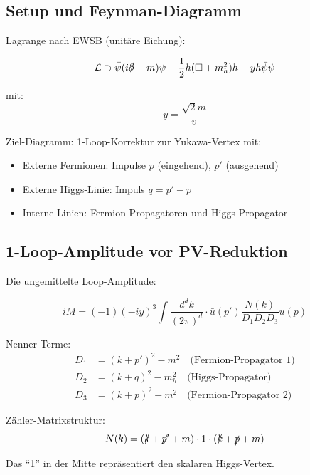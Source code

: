 	\subsection{Setup und Feynman-Diagramm}
	
	Lagrange nach EWSB (unitäre Eichung):
	
	\begin{equation}
		\mathcal{L} \supset \bar{\psi}(i\slashed{\partial} - m)\psi - \frac{1}{2}h(\Box + m_h^2)h - y h \bar{\psi}\psi
	\end{equation}
	
	mit:
	\begin{equation}
		y = \frac{\sqrt{2} m}{v}
	\end{equation}
	
	Ziel-Diagramm: 1-Loop-Korrektur zur Yukawa-Vertex mit:
	\begin{itemize}
		\item Externe Fermionen: Impulse $p$ (eingehend), $p'$ (ausgehend)
		\item Externe Higgs-Linie: Impuls $q = p' - p$
		\item Interne Linien: Fermion-Propagatoren und Higgs-Propagator
	\end{itemize}
	
	\subsection{1-Loop-Amplitude vor PV-Reduktion}
	
	Die ungemittelte Loop-Amplitude:
	
	\begin{equation}
		iM = (-1)(-iy)^3 \int \frac{d^d k}{(2\pi)^d} \cdot \bar{u}(p') \frac{N(k)}{D_1 D_2 D_3} u(p)
	\end{equation}
	
	Nenner-Terme:
	\begin{align}
		D_1 &= (k + p')^2 - m^2 \quad \text{(Fermion-Propagator 1)}\\
		D_2 &= (k + q)^2 - m_h^2 \quad \text{(Higgs-Propagator)}\\
		D_3 &= (k + p)^2 - m^2 \quad \text{(Fermion-Propagator 2)}
	\end{align}
	
	Zähler-Matrixstruktur:
	\begin{equation}
		N(k) = (\slashed{k} + \slashed{p'} + m) \cdot 1 \cdot (\slashed{k} + \slashed{p} + m)
	\end{equation}
	
	Das ``1'' in der Mitte repräsentiert den skalaren Higgs-Vertex.
	
